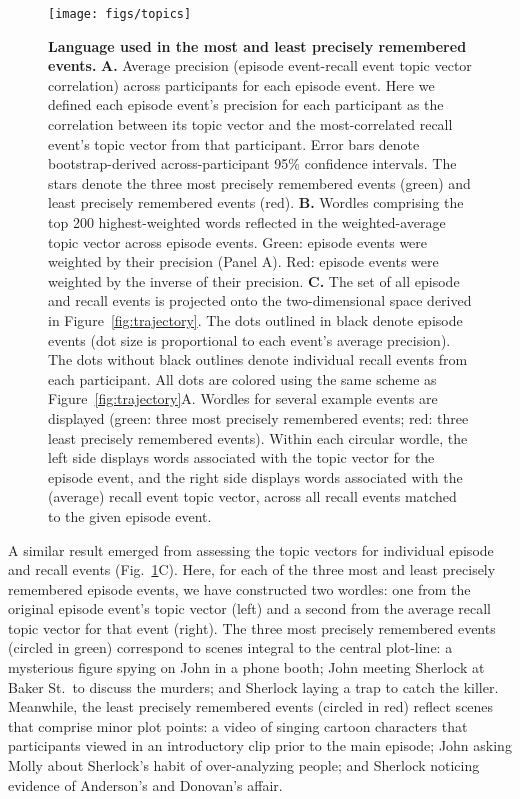 \documentclass[10pt]{article}
\begin{document}
\begin{figure}[tp]
\centering
\texttt{[image: figs/topics]}
\caption{\small \textbf{Language used in the most and least precisely remembered events.} \textbf{A.} Average precision (episode event-recall event topic vector correlation) across participants for each episode event.  Here we defined each episode event's precision for each participant as the correlation between its topic vector and the most-correlated recall event's topic vector from that participant.  Error bars denote bootstrap-derived across-participant 95\% confidence intervals.  The stars denote the three most precisely remembered events (green) and least precisely remembered events (red).  \textbf{B.} Wordles comprising the top 200 highest-weighted words reflected in the weighted-average topic vector across episode events.  Green: episode events were weighted by their precision (Panel A).  Red: episode events were weighted by the inverse of their precision.  \textbf{C.}  The set of all episode and recall events is projected onto the two-dimensional space derived in Figure~\ref{fig:trajectory}.  The dots outlined in black denote episode events (dot size is proportional to each event's average precision).  The dots without black outlines denote individual recall events from each participant.  All dots are colored using the same scheme as Figure~\ref{fig:trajectory}A.  Wordles for several example events are displayed (green: three most precisely remembered events; red: three least precisely remembered events).  Within each circular wordle, the left side displays words associated with the topic vector for the episode event, and the right side displays words associated with the (average) recall event topic vector, across all recall events matched to the given episode event.}
\label{fig:topics}
\end{figure}

A similar result emerged from assessing the topic vectors for individual episode and recall events (Fig.~\ref{fig:topics}C).  Here, for each of the three most and least precisely remembered episode events, we have constructed two wordles: one from the original episode event's topic vector (left) and a second from the average recall topic vector for that event (right).  The three most precisely remembered events (circled in green) correspond to scenes integral to the central plot-line: a mysterious figure spying on John in a phone booth; John meeting Sherlock at Baker St.~to discuss the murders; and Sherlock laying a trap to catch the killer.  Meanwhile, the least precisely remembered events (circled in red) reflect scenes that comprise minor plot points: a video of singing cartoon characters that participants viewed in an introductory clip prior to the main episode; John asking Molly about Sherlock's habit of over-analyzing people; and Sherlock noticing evidence of Anderson's and Donovan's affair.
\end{document}
